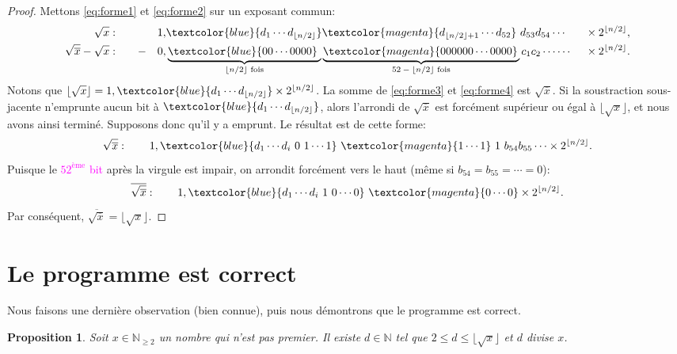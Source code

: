 \documentclass{article}
\newcommand{\N}{\mathbb{N}}
\newcommand{\emphc}[1]{\textcolor{blue}{#1}}
\newcommand{\emphcc}[1]{\textcolor{magenta}{#1}}
\newtheorem{proposition}[theorem]{Proposition}
\begin{document}
\begin{proof}
  Mettons \eqref{eq:forme1} et \eqref{eq:forme2} sur un exposant
  commun:
  \begin{alignat}{3}
    \sqrt{x}:\qquad & &&1{,}\emphc{d_1 \cdots d_{\lfloor n/2 \rfloor}}
    \emphcc{d_{\lfloor n/2 \rfloor + 1} \cdots d_{52}}\ d_{53} d_{54} \cdots &{}
    \times 2^{\lfloor n/2 \rfloor}\label{eq:forme3}, \\
    \sqrt{\overline{x}} - \sqrt{x}:\qquad &-&&0{,}\underbrace{\emphc{00
      \cdots 0000}\,\,}_{\text{$\lfloor n/2 \rfloor$~fois}}\underbrace{\emphcc{000000
      \cdots 0000}\,}_{\text{$52 - \lfloor n/2 \rfloor$~fois}} c_1 c_2 \cdots \cdots\ &{}
    \times 2^{\lfloor n/2 \rfloor}.\label{eq:forme4}
  \end{alignat}
  Notons que $\lfloor \sqrt{x} \rfloor = 1,\emphc{d_1 \cdots
    d_{\lfloor n/2 \rfloor}} \times 2^{\lfloor n/2 \rfloor}$. La somme
  de \eqref{eq:forme3} et \eqref{eq:forme4} est
  $\sqrt{\overline{x}}$. Si la soustraction sous-jacente n'emprunte
  aucun bit à $\emphc{d_1 \cdots d_{\lfloor n/2 \rfloor}}$, alors
  l'arrondi de $\sqrt{\overline{x}}$ est forcément supérieur ou égal à
  $\lfloor \sqrt{x} \rfloor$, et nous avons ainsi terminé. Supposons
  donc qu'il y a emprunt. Le résultat est de cette forme:
  \[
  \sqrt{\overline{x}}:\qquad
  1,\emphc{d_1 \cdots d_i\ 0\ 1 \cdots 1}\ \emphcc{1 \cdots
    1}\ 1\ b_{54} b_{55} \cdots \times 2^{\lfloor n/2 \rfloor}.
  \]
  Puisque le \emphcc{$52^\text{ème}$ bit} après la virgule est impair,
  on arrondit forcément vers le haut (même si $b_{54} = b_{55} =
  \cdots = 0$):
  \[
  \overline{\sqrt{\overline{x}}}:\qquad
  1,\emphc{d_1 \cdots d_i\ 1\ 0 \cdots 0}\ \emphcc{0 \cdots
    0} \times 2^{\lfloor n/2 \rfloor}.
  \]
  Par conséquent, $\overline{\sqrt{\overline{x}}} = \lfloor \sqrt{x}
  \rfloor$.
\end{proof}

\section{Le programme est correct}

Nous faisons une dernière observation (bien connue), puis nous
démontrons que le programme est correct.

\begin{proposition}\label{prop:premier}
  Soit $x \in \N_{\geq 2}$ un nombre qui n'est pas premier. Il existe
  $d \in \N$ tel que $2 \leq d \leq \lfloor\sqrt{x}\rfloor$ et $d$
  divise $x$.
\end{proposition}
\end{document}
